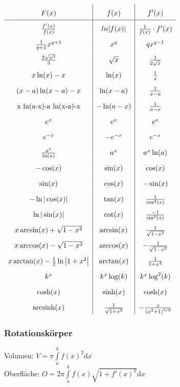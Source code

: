 \documentclass[6pt,a4paper]{scrartcl}
\newcommand{\enbrace}[1]{\ensuremath{\left(#1\right)}}
\begin{document}
\begin{multicols}{4}
\everymath{\displaystyle}	%
\begin{math}\renewcommand{\arraystretch}{1.8}
\begin{array}{c|c|c}
F(x) & f(x) & f'(x) \\ \hline 
\frac{f'(x)}{f(x)}&ln|f(x)|&\frac{1}{f(x)}\cdot f'(x)\\
\frac{1}{q+1}x^{q+1} & x^q & qx^{q-1} \\
\frac{2\sqrt{x^3}}{3} & \sqrt{x} & \frac{1}{2\sqrt{x}}\\
x\ln(x) -x & \ln(x) & \textstyle \frac{1}{x}\\
(x-a) \ln(x-a) -x & \ln(x-a) & \frac{1}{x-a} \\
$x ln(a-x)-a ln(x-a)-x$ & -\ln(a-x) & \frac{1}{a-x} \\
e^x & e^x & e^x \\
e^{-x} & -e^{-x} & e^{-x} \\
\frac{a^x}{\ln(a)} & a^x & a^x \ln(a) \\
-\cos(x) & \sin(x) & \cos(x)\\
\sin(x) & \cos(x) & -\sin(x)\\
-\ln |\cos(x)| & \tan(x) & \frac{1}{\cos^2(x)} \\
\ln |\sin(x)| & \cot(x) & \frac{-1}{\sin^2(x)} \\
x\arcsin (x)+\sqrt{1-x^2} & \arcsin(x) & \frac{1}{\sqrt{1-x^2}}\\
x\arccos (x)-\sqrt{1-x^2} & \arccos(x) & -\frac{1}{\sqrt{1-x^2}}\\
x\arctan (x)-\frac{1}{2} \ln \left| 1+ x^2 \right| & \arctan (x) & \frac{1}{1+x^2} \\
k^x & k^x \log(k) & k^x \log^2(k) \\
\cosh(x) & \sinh(x) & \cosh(x) \\
$arcsinh$(x) & \frac{1}{\sqrt{1+x^2}} & -\frac{x}{\enbrace{x^2+1}^{3/2}}
\end{array}
\end{math}
\everymath{\textstyle}


\subsubsection{Rotationskörper}
Volumen: $V = \pi \int\limits_a^b f(x)^2 \mathrm dx$\\
Oberfläche: $O = 2 \pi \int\limits_a^b f(x) \sqrt{1 + f'(x)^2} \mathrm dx$


\end{multicols}
\end{document}
